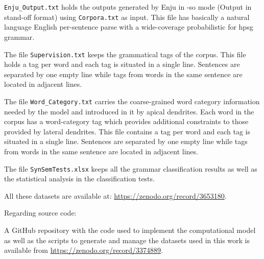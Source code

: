 {\texttt{Enju\_Output.txt} holds the outputs generated by Enju in -so mode (Output in stand-off format) using \texttt{Corpora.txt} as input. This file has basically a natural language English per-sentence parse with a wide-coverage probabilistic for \gls{hpsg} grammar.

The file \texttt{Supervision.txt} keeps the grammatical tags of the corpus. This file holds a tag per word and each tag is situated in a single line. Sentences are separated by one empty line while tags from words in the same sentence are located in adjacent lines.

The file \texttt{Word\_Category.txt} carries the coarse-grained word category information needed by the model and introduced in it by apical dendrites. Each word in the corpus has a word-category tag which provides additional constraints to those provided by lateral dendrites. This file contains a tag per word and each tag is situated in a single line. Sentences are separated by one empty line while tags from words in the same sentence are located in adjacent lines.

The file \texttt{SynSemTests.xlsx} keeps all the grammar classification results as well as the statistical analysis in the classification tests.




All these datasets are available at: \url{https://zenodo.org/record/3653180}.

Regarding source code:

A GitHub repository with the code used to implement the computational model as well as the scripts to generate and manage the datasets used in this work is available from \url{https://zenodo.org/record/3374889}.
}





